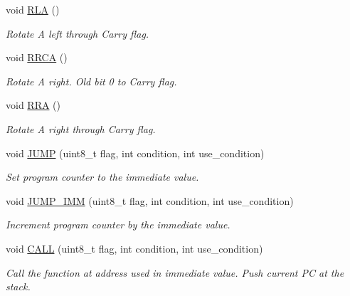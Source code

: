 \begin{DoxyCompactItemize}
\mbox{\label{classCPU_a009ae3027dcc0d338cb95b28240a1658}} 
void \mbox{\hyperlink{classCPU_a009ae3027dcc0d338cb95b28240a1658}{R\+LA}} ()
\begin{DoxyCompactList}\small\item\em Rotate A left through Carry flag. \end{DoxyCompactList}\item 
\mbox{\label{classCPU_a6a7bce529dc34cf90f5869787d586623}} 
void \mbox{\hyperlink{classCPU_a6a7bce529dc34cf90f5869787d586623}{R\+R\+CA}} ()
\begin{DoxyCompactList}\small\item\em Rotate A right. Old bit 0 to Carry flag. \end{DoxyCompactList}\item 
\mbox{\label{classCPU_a692b09a97bbf250a2fc8c34d0010e768}} 
void \mbox{\hyperlink{classCPU_a692b09a97bbf250a2fc8c34d0010e768}{R\+RA}} ()
\begin{DoxyCompactList}\small\item\em Rotate A right through Carry flag. \end{DoxyCompactList}\item 
void \mbox{\hyperlink{classCPU_a24d4360b3948467f956fcb1b85c119d2}{J\+U\+MP}} (uint8\+\_\+t flag, int condition, int use\+\_\+condition)
\begin{DoxyCompactList}\small\item\em Set program counter to the immediate value. \end{DoxyCompactList}\item 
void \mbox{\hyperlink{classCPU_af67fa16329e2c198a0594d0177fea86b}{J\+U\+M\+P\+\_\+\+I\+MM}} (uint8\+\_\+t flag, int condition, int use\+\_\+condition)
\begin{DoxyCompactList}\small\item\em Increment program counter by the immediate value. \end{DoxyCompactList}\item 
void \mbox{\hyperlink{classCPU_a2e376bf06a7a624a91c1c5c696963a61}{C\+A\+LL}} (uint8\+\_\+t flag, int condition, int use\+\_\+condition)
\begin{DoxyCompactList}\small\item\em Call the function at address used in immediate value. Push current PC at the stack. \end{DoxyCompactList}\item 

\end{DoxyCompactItemize}
